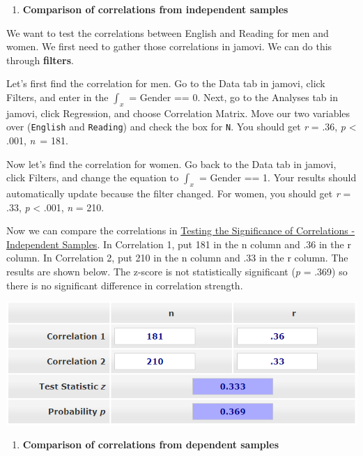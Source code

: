 \documentclass[
]{book}
\providecommand{\tightlist}{%
  \setlength{\itemsep}{0pt}\setlength{\parskip}{0pt}}
\begin{document}
\begin{enumerate}
\def\labelenumi{\arabic{enumi}.}
\tightlist
\item
  \textbf{Comparison of correlations from independent samples}
\end{enumerate}

We want to test the correlations between English and Reading for men and women. We first need to gather those correlations in jamovi. We can do this through \textbf{filters}.

Let's first find the correlation for men. Go to the Data tab in jamovi, click Filters, and enter in the \(\int_x\) = Gender == 0. Next, go to the Analyses tab in jamovi, click Regression, and choose Correlation Matrix. Move our two variables over (\texttt{English} and \texttt{Reading}) and check the box for \texttt{N}. You should get \emph{r} = .36, \emph{p} \textless{} .001, \emph{n}~= 181.

Now let's find the correlation for women. Go back to the Data tab in jamovi, click Filters, and change the equation to \(\int_x\) = Gender == 1. Your results should automatically update because the filter changed. For women, you should get \emph{r} = .33, \emph{p} \textless{} .001, \emph{n} = 210.

Now we can compare the correlations in \href{https://www.psychometrica.de/correlation.html\#independent}{Testing the Significance of Correlations - Independent Samples}. In Correlation 1, put 181 in the n column and .36 in the r column. In Correlation 2, put 210 in the n column and .33 in the r column. The results are shown below. The z-score is not statistically significant (\emph{p} = .369) so there is no significant difference in correlation strength.

\includegraphics{images/08-correlation/compare-correlations-independent.png}

\begin{enumerate}
\def\labelenumi{\arabic{enumi}.}
\setcounter{enumi}{1}
\tightlist
\item
  \textbf{Comparison of correlations from dependent samples}
\end{enumerate}
\end{document}
